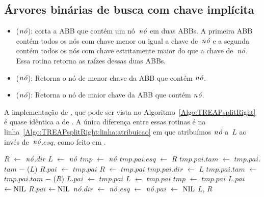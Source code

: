 \subsection{Árvores binárias de busca com chave implícita}

\begin{itemize}
\item \treapSplitRight($\node$): corta a ABB que contém um nó~$\node$ em duas ABBs. A primeira ABB contém todos os nós com chave menor ou igual a chave de~$\node$ e a segunda contém todos os nós com chave estritamente maior do que a chave de~$\node$. Essa rotina retorna as raízes dessas duas ABBs.
\item \treapFirst($\node$): Retorna o nó de menor chave da ABB que contém $\node$.
\item \treapLast($\node$): Retorna o nó de maior chave da ABB que contém $\node$.
\end{itemize}

A implementação de \treapSplitRight{}, que pode ser vista no Algoritmo~\ref{Algo:TREAPsplitRight} é quase idêntica a de \treapSplit{}.
A única diferença entre essas rotinas é na linha~\ref{Algo:TREAPsplitRight:linha:atribuicao} em que atribuímos $\node$ a~$L$ ao invés de~$\node$.$esq$, como feito em \treapSplit{}.

\begin{algorithm}
\caption{\treapSplitRight($\node$)}
\label{Algo:TREAPsplitRight}
\begin{algorithmic}[1]
\State $R$ $\gets $ $\node$.$dir$
\State $L$ $\gets $ $\node$ \label{Algo:TREAPsplitRight:linha:atribuicao}
\State $tmp$ $\gets$ $\node$
    \State $tmp$.$pai$.$esq$ $\gets$ $R$
    \State $tmp$.$pai$.$tam$ $\gets$ $tmp$.$pai$.$tam$ $\mathit{-}$ \treapGetSize($L$)
    \State $R$.$pai$ $\gets$ $tmp$.$pai$
    \EndIf
    \State $R$ $\gets$ $tmp$.$pai$
  \Else
    \State $tmp$.$pai$.$dir$ $\gets$ $L$ 
    \State $tmp$.$pai$.$tam$ $\gets$ $tmp$.$pai$.$tam$ $\mathit{-}$ \treapGetSize($R$)
    \State $L$.$pai$ $\gets$ $tmp$.$pai$
    \EndIf
    \State $L$ $\gets$ $tmp$.$pai$
  \EndIf
  \State $tmp$ $\gets$ $tmp$.$pai$
\EndWhile
{} $L$.$pai$ $\gets\text{NIL}$\EndIf
{} $R$.$pai$ $\gets\text{NIL}$\EndIf
\State $\node$.$dir$ $\gets $ $\node$.$esq$ $\gets$ $\node$.$pai$ $\gets$ $\text{NIL}$
\State\Return $L$, $R$
\end{algorithmic}
\end{algorithm}



